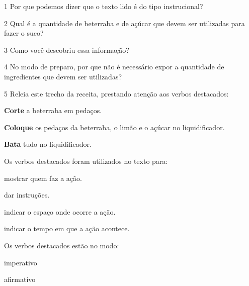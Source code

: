 \num{1} Por que podemos dizer que o texto lido é do tipo instrucional?


\num{2} Qual é a quantidade de beterraba e de açúcar que devem ser utilizadas
para fazer o suco?


\num{3} Como você descobriu essa informação?


\num{4} No modo de preparo, por que não é necessário expor a quantidade de
ingredientes que devem ser utilizadas?


\pagebreak
\num{5} Releia este trecho da receita, prestando atenção aos verbos destacados:

\begin{myquote}

\textbf{Corte} a beterraba em pedaços.

\textbf{Coloque} os pedaços da beterraba, o limão e o açúcar no liquidificador.

\textbf{Bata} tudo no liquidificador. 

\end{myquote}

\begin{escolha}
\item Os verbos destacados foram utilizados no texto para:

\begin{boxlist}
 mostrar quem faz a ação.

 dar instruções.

 indicar o espaço onde ocorre a ação.

 indicar o tempo em que a ação acontece.
\end{boxlist}

\item Os verbos destacados estão no modo:

\begin{boxlist}
 imperativo

 afirmativo
\end{boxlist}

\end{escolha}

